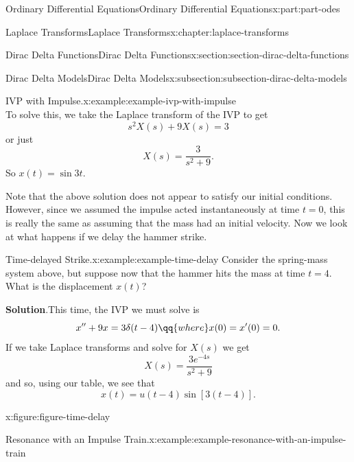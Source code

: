 \documentclass[twoside,10pt,]{book}
\newcommand{\blocktitlefont}{\relax}
\numberwithin{equation}{part}
\begin{document}
\begin{partptx}{Ordinary Differential Equations}{}{Ordinary Differential Equations}{}{}{x:part:part-odes}
\begin{chapterptx}{Laplace Transforms}{}{Laplace Transforms}{}{}{x:chapter:laplace-transforms}
\begin{sectionptx}{Dirac Delta Functions}{}{Dirac Delta Functions}{}{}{x:section:section-dirac-delta-functions}
\begin{subsectionptx}{Dirac Delta Models}{}{Dirac Delta Models}{}{}{x:subsection:subsection-dirac-delta-models}
\begin{example}{IVP with Impulse.}{x:example:example-ivp-with-impulse}
\begin{equation*}
\end{equation*}
To solve this, we take the Laplace transform of the IVP to get%
\begin{equation*}
s^{2}X(s)+9X(s) = 3
\end{equation*}
or just%
\begin{equation*}
X(s) = \frac{3}{s^{2}+9}.
\end{equation*}
So \(x(t) = \sin3t\).%
\end{example}
Note that the above solution does not appear to satisfy our initial conditions. However, since we assumed the impulse acted instantaneously at time \(t=0\), this is really the same as assuming that the mass had an initial velocity. Now we look at what happens if we delay the hammer strike.%
\begin{example}{Time-delayed Strike.}{x:example:example-time-delay}%
Consider the spring-mass system above, but suppose now that the hammer hits the mass at time \(t=4\). What is the displacement \(x(t)\)?%
\par\smallskip%
\noindent\textbf{\blocktitlefont Solution}.\hypertarget{g:solution:idp105548816730528}{}\quad{}This time, the IVP we must solve is%
\begin{equation*}
x''+9x = 3\delta(t-4)\qq{where}x(0)=x'(0)=0.
\end{equation*}
If we take Laplace transforms and solve for \(X(s)\) we get%
\begin{equation*}
X(s) = \frac{3e^{-4s}}{s^{2}+9}
\end{equation*}
and so, using our table, we see that%
\begin{equation*}
x(t) = u(t-4)\sin[3(t-4)].
\end{equation*}
%
\end{example}
\begin{figureptx}{}{x:figure:figure-time-delay}{}%
\begin{image}{0}{1}{0}%
%
\end{image}%
\tcblower
\end{figureptx}%
\begin{example}{Resonance with an Impulse Train.}{x:example:example-resonance-with-an-impulse-train}%

\end{example}
\end{subsectionptx}
\end{sectionptx}
\end{chapterptx}
\end{partptx}
\end{document}
